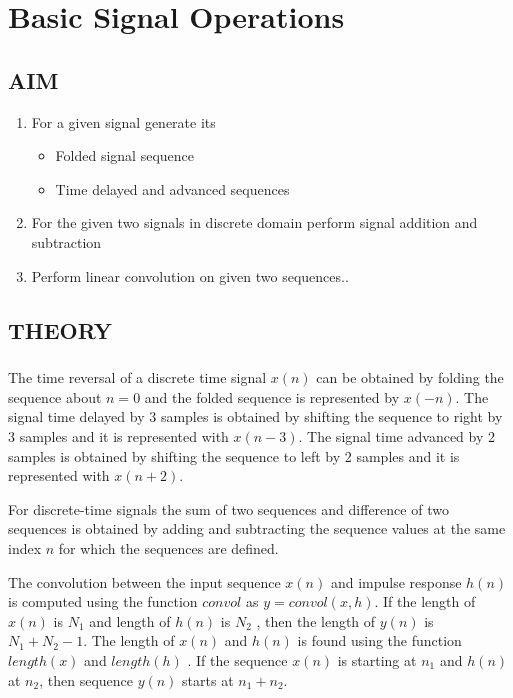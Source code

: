 \chapter [Basic Signal Operations]{Basic Signal Operations}


\section{AIM}
\begin{enumerate}
\item
For a given signal generate its
\begin{itemize}
\item
Folded signal sequence
\item
Time delayed and advanced sequences

\end{itemize}
\item
For the given two signals in discrete domain perform signal addition and subtraction
\item
Perform linear convolution on given two sequences..

\end{enumerate}
\section{THEORY}
\paragraph{}

The time reversal of a discrete time signal $x(n)$ can be obtained by folding the sequence about $n=0$ and the folded sequence is represented by $x(-n)$. The signal time delayed by 3 samples  is obtained by shifting the sequence to right by 3 samples and it is represented with $x(n-3)$. The signal time advanced by 2 samples  is obtained by shifting the sequence to left by 2 samples and it is represented with $x(n+2)$.	
	
	
	For discrete-time signals the sum of two sequences and difference of two sequences is obtained by adding and subtracting the sequence values at the same index $n$ for which the sequences are defined.
	
The convolution between the input sequence $x(n)$ and impulse response $h(n)$ is computed using the function $convol$ as $y=convol(x,h)$. If the length of $x(n)$ is $N_1$ and length of $h(n)$ is $N_2$ , then the length of $y(n)$ is $N_1+N_2-1$. The length of $x(n)$ and $h(n)$ is found using the function $length(x)$ and $length(h)$ . If the sequence $x(n)$ is starting at $n_1$ and $h(n)$ at $n_2$, then sequence $y(n)$ starts at $n_1+n_2$.


